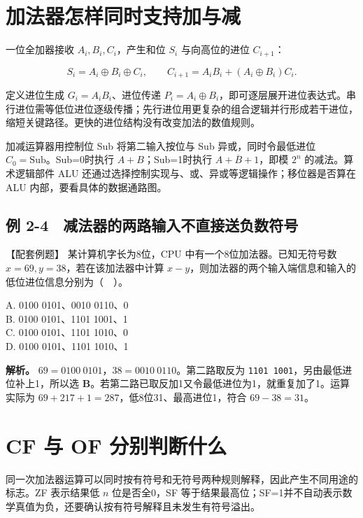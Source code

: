 \section{加法器怎样同时支持加与减}\label{CO02-09}

一位全加器接收 \(A_i,B_i,C_i\)，产生和位 \(S_i\) 与向高位的进位 \(C_{i+1}\)：

\[
S_i=A_i\oplus B_i\oplus C_i,
\qquad C_{i+1}=A_iB_i+(A_i\oplus B_i)C_i.
\]

定义进位生成 \(G_i=A_iB_i\)、进位传递 \(P_i=A_i\oplus B_i\)，即可逐层展开进位表达式。串行进位需等低位进位逐级传播；先行进位用更复杂的组合逻辑并行形成若干进位，缩短关键路径。更快的进位结构没有改变加法的数值规则。

加减运算器用控制位 Sub 将第二输入按位与 Sub 异或，同时令最低进位 \(C_0=\mathrm{Sub}\)。Sub=0时执行 \(A+B\)；Sub=1时执行 \(A+\overline B+1\)，即模 \(2^n\) 的减法。算术逻辑部件 ALU 还通过选择控制实现与、或、异或等逻辑操作；移位器是否算在 ALU 内部，要看具体的数据通路图。

\subsection{例 2-4　减法器的两路输入不直接送负数符号}\label{CO02-10}

\begin{example}[配套例题]

【配套例题】 某计算机字长为8位，CPU 中有一个8位加法器。已知无符号数 \(x=69,y=38\)，若在该加法器中计算 \(x-y\)，则加法器的两个输入端信息和输入的低位进位信息分别为（　）。

A. 0100 0101、0010 0110、0\\
B. 0100 0101、1101 1001、1\\
C. 0100 0101、1101 1010、0\\
D. 0100 0101、1101 1010、1

\end{example}

\textbf{解析。} \(69=0100\ 0101\)，\(38=0010\ 0110\)。第二路取反为 \texttt{1101 1001}，另由最低进位补上1，所以选 \textbf{B}。若第二路已取反加1又令最低进位为1，就重复加了1。运算实际为 \(69+217+1=287\)，低8位31、最高进位1，符合 \(69-38=31\)。

\section{CF 与 OF 分别判断什么}\label{CO02-11}

同一次加法器运算可以同时按有符号和无符号两种规则解释，因此产生不同用途的标志。ZF 表示结果低 \(n\) 位是否全0，SF 等于结果最高位；SF=1并不自动表示数学真值为负，还要确认按有符号解释且未发生有符号溢出。

